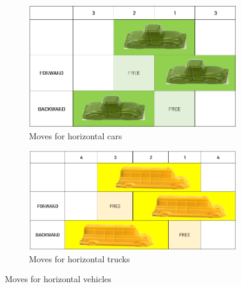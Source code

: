 \documentclass{article}
\begin{document}
\begin{figure}[H]
    \centering
    \begin{subfigure}{.5\textwidth}
      \centering
      \includegraphics[width=.82\linewidth]{images/hor_car.png}
      \caption{Moves for horizontal cars}
    \end{subfigure}%
    \begin{subfigure}{.5\textwidth}
      \centering
      \includegraphics[width=1\linewidth]{images/truck_or.png}
      \caption{Moves for horizontal trucks}
    \end{subfigure}
    \caption{Moves for horizontal vehicles}
    \label{fig:horizontal}
\end{figure}
\end{document}
